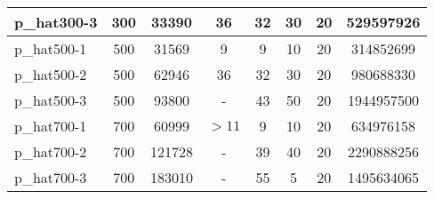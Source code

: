 \begin{tabular}{|l|c|c|c|c|c|c|c|}
\hline
p\_hat300-3 & 300 & 33390 & 36 & 32 & 30 & 20 & 529597926\\ 
\hline
p\_hat500-1 & 500 & 31569 & 9 & 9 & 10 & 20 & 314852699\\ 
\hline
p\_hat500-2 & 500 & 62946 & 36 & 32 & 30 & 20 & 980688330\\
\hline
p\_hat500-3 & 500 & 93800 & -  & 43 & 50 & 20 & 1944957500\\ 
\hline
p\_hat700-1 & 700 & 60999 & $>11$ & 9 & 10 & 20 & 634976158\\ 
\hline
p\_hat700-2 & 700 & 121728 & -  & 39 & 40 & 20 & 2290888256\\ 
\hline
p\_hat700-3 & 700 & 183010 & -  & 55 & 5 & 20 & 1495634065\\ 
\hline
\end{tabular}









 





 

 

 



